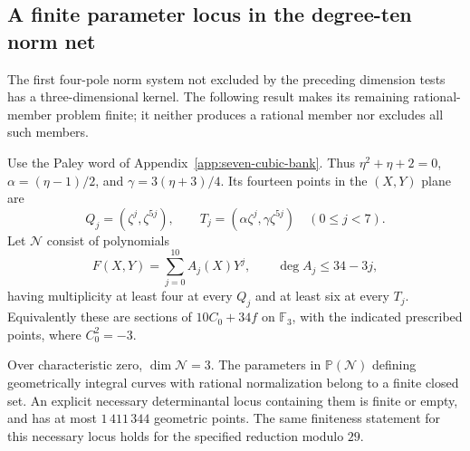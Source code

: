 \subsection{A finite parameter locus in the degree-ten norm net}
\label{sec:degree-ten-finite-locus}

The first four-pole norm system not excluded by the preceding dimension
tests has a three-dimensional kernel.  The following result makes its
remaining rational-member problem finite; it neither produces a rational
member nor excludes all such members.

Use the Paley word of Appendix~\ref{app:seven-cubic-bank}.  Thus
$\eta^2+\eta+2=0$, $\alpha=(\eta-1)/2$, and
$\gamma=3(\eta+3)/4$.  Its fourteen points in the $(X,Y)$ plane are
\[
 Q_j=(\zeta^j,\zeta^{5j}),\qquad
 T_j=(\alpha\zeta^j,\gamma\zeta^{5j})
 \quad(0\le j<7).
\]
Let $\mathcal N$ consist of polynomials
\[
 F(X,Y)=\sum_{j=0}^{10}A_j(X)Y^j,
 \qquad \deg A_j\le34-3j,
\]
having multiplicity at least four at every $Q_j$ and at least six at
every $T_j$.  Equivalently these are sections of
$10C_0+34f$ on $\mathbb F_3$, with the indicated prescribed points,
where $C_0^2=-3$.

\begin{theorem}\label{thm:degree-ten-finite-rational-locus}
Over characteristic zero, $\dim\mathcal N=3$.
The parameters in $\mathbb P(\mathcal N)$ defining geometrically integral
curves with rational normalization belong to a finite closed set.
An explicit necessary determinantal locus containing them is finite or
empty, and has at most $1\,411\,344$ geometric points.
The same finiteness statement for this necessary locus holds for the
specified reduction modulo $29$.
\end{theorem}


